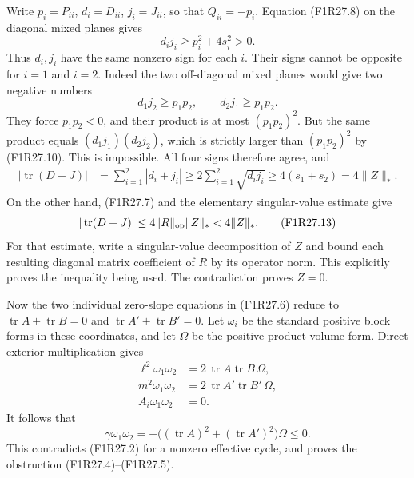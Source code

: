 Write $p_i=P_{ii}$, $d_i=D_{ii}$, $j_i=J_{ii}$,
so that $Q_{ii}=-p_i$.
Equation (F1R27.8) on the diagonal mixed planes
gives
\[
                         d_i j_i\ge p_i^2+4s_i^2>0.
 \tag{F1R27.10}
\]
Thus $d_i,j_i$ have the same nonzero sign
for each $i$. Their signs cannot be opposite
for $i=1$ and $i=2$. Indeed the two off-diagonal
mixed planes would give two negative numbers
\[
                    d_1j_2\ge p_1p_2,\qquad
                    d_2j_1\ge p_1p_2.
 \tag{F1R27.11}
\]
They force $p_1p_2<0$, and their product is
at most $(p_1p_2)^2$. But the same product
equals $(d_1j_1)(d_2j_2)$, which is strictly
larger than $(p_1p_2)^2$ by (F1R27.10).
This is impossible. All four signs therefore
agree, and
\[
 \begin{split}
 |\operatorname{tr}(D+J)|
    &=\sum_{i=1}^2|d_i+j_i|
      \ge2\sum_{i=1}^2\sqrt{d_i j_i}
      \ge4(s_1+s_2)=4\|Z\|_*.
 \end{split}
 \tag{F1R27.12}
\]
On the other hand, (F1R27.7) and the elementary
singular-value estimate give
\[
 |\operatorname{tr}(D+J)|
   \le4\|R\|_{\rm op}\|Z\|_*<4\|Z\|_*.
 \tag{F1R27.13}
\]
For that estimate, write a singular-value
decomposition of $Z$ and bound each resulting
diagonal matrix coefficient of $R$ by its
operator norm. This explicitly proves the
inequality being used. The contradiction
proves $Z=0$.

Now the two individual zero-slope equations
in (F1R27.6) reduce to
$\operatorname{tr}A+\operatorname{tr}B=0$
and
$\operatorname{tr}A'+\operatorname{tr}B'=0$.
Let $\omega_i$ be the standard positive
block forms in these coordinates, and let
$\Omega$ be the positive product volume form.
Direct exterior multiplication gives
\[
 \begin{split}
 \ell^2\omega_1\omega_2
       &=2\,\operatorname{tr}A\operatorname{tr}B\,\Omega,\\
 m^2\omega_1\omega_2
       &=2\,\operatorname{tr}A'\operatorname{tr}B'\,\Omega,\\
 A_i\omega_1\omega_2&=0.
 \end{split}
 \tag{F1R27.14}
\]
It follows that
\[
       \gamma\omega_1\omega_2
          =-\bigl((\operatorname{tr}A)^2+
                    (\operatorname{tr}A')^2\bigr)\Omega\le0.
 \tag{F1R27.15}
\]
This contradicts (F1R27.2) for a nonzero
effective cycle, and proves the obstruction
(F1R27.4)--(F1R27.5).


